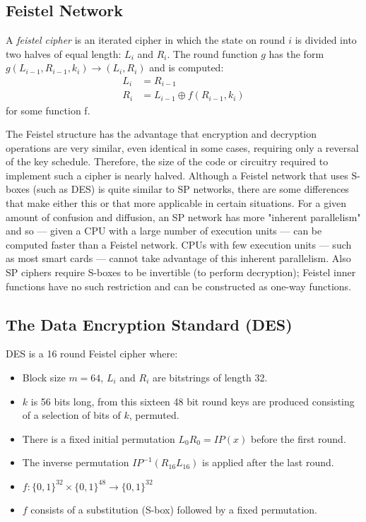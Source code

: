 \subsection{Feistel Network}
\begin{center}\feistel\end{center}
\begin{definition}
    A \textit{feistel cipher} is an iterated cipher
    in which the state on round $i$ is divided into two halves of equal length: $L_i$ and $R_i$.
    The round function $g$ has the form $g(L_{i−1}, R_{i−1}, k_i) \rightarrow (L_i, R_i)$ and is computed:
    \begin{align*}
        L_i &= R_{i−1} \\
        R_i &= L_{i−1} \oplus f(R_{i-1},k_i)
    \end{align*}
    for some function f.
\end{definition}
The Feistel structure has the advantage that encryption and decryption operations are very similar,
even identical in some cases, requiring only a reversal of the key schedule.
Therefore, the size of the code or circuitry required to implement such a cipher is nearly halved.
Although a Feistel network that uses S-boxes (such as DES) is quite similar to SP networks,
there are some differences that make either this or that more applicable in certain situations.
For a given amount of confusion and diffusion,
an SP network has more "inherent parallelism" and so — given a CPU with a large number of execution units — can be computed faster than a Feistel network.
CPUs with few execution units — such as most smart cards — cannot take advantage of this inherent parallelism.
Also SP ciphers require S-boxes to be invertible (to perform decryption);
Feistel inner functions have no such restriction and can be constructed as one-way functions.

\subsection{The Data Encryption Standard (DES)}
\begin{center}\des\end{center}
\begin{definition}
    DES is a 16 round Feistel cipher where:
    \begin{itemize}
        \item Block size $m = 64$, $L_i$ and $R_i$ are bitstrings of length 32.
        \item $k$ is 56 bits long, from this sixteen 48 bit round keys are produced consisting of a selection of bits of $k$, permuted.
        \item There is a fixed initial permutation $L_0R_0 = IP(x)$ before the first round.
        \item The inverse permutation $IP^{−1}(R_{16}L_{16})$ is applied after the last round.
        \item $f :\{0,1\}^{32} \times \{0,1\}^{48} \rightarrow \{0,1\}^{32}$
        \item $f$ consists of a substitution (S-box) followed by a fixed permutation.
    \end{itemize}
\end{definition}

